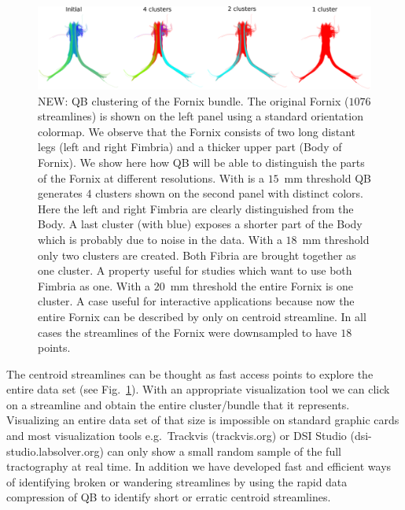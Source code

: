 \documentclass{bioinfo}
\begin{document}
\begin{figure}[htp]
\centerline{\includegraphics[width=160mm]{Figures/Fig_6_QB_fornix}}
\caption{NEW: QB clustering of the Fornix bundle. The original Fornix
  ($1076$ streamlines) is shown on the left panel using a standard
  orientation colormap. We observe that the Fornix consists of two long
  distant legs (left and right Fimbria) and a thicker upper part (Body
  of Fornix). We show here how QB will be able to distinguish the parts
  of the Fornix at different resolutions. With is a $15$~mm threshold QB
  generates 4 clusters shown on the second panel with distinct
  colors. Here the left and right Fimbria are clearly distinguished from
  the Body. A last cluster (with blue) exposes a shorter part of the
  Body which is probably due to noise in the data. With a $18$~mm
  threshold only two clusters are created. Both Fibria are brought
  together as one cluster. A property useful for studies which want to
  use both Fimbria as one. With a $20$~mm threshold the entire Fornix is
  one cluster. A case useful for interactive applications because now
  the entire Fornix can be described by only on centroid streamline. In
  all cases the streamlines of the Fornix were downsampled to have $18$
  points.\label{Flo:QB_fornix}}
\end{figure}

The centroid streamlines can be thought as fast access points to explore
the entire data set (see Fig.~\ref{Flo:QB_fornix}). With an appropriate
visualization tool we can click on a streamline and obtain the entire
cluster/bundle that it represents. Visualizing an entire data set of
that size is impossible on standard graphic cards and most visualization
tools e.g.~Trackvis (trackvis.org) or DSI Studio
(dsi-studio.labsolver.org) can only show a small random sample of the
full tractography at real time. In addition we have developed fast and
efficient ways of identifying broken or wandering streamlines by using
the rapid data compression of QB to identify short or erratic centroid
streamlines.



\end{document}
